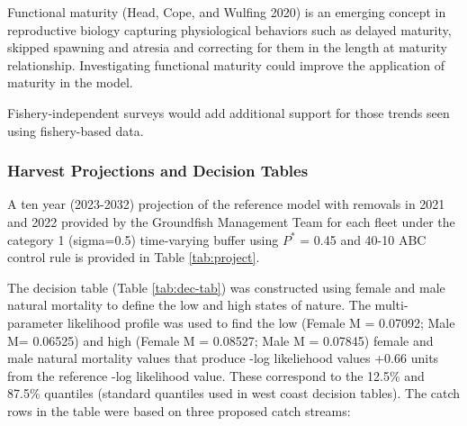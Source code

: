 \documentclass[11pt,
  english,
  a4paper,
]{article}
\begin{document}
\leavevmode\tagmcend\tagstructend\par


Functional maturity {(Head, Cope, and Wulfing 2020)\leavevmode\tagmcend\tagstructend} is an emerging concept in reproductive biology capturing physiological behaviors such as delayed maturity, skipped spawning and atresia and correcting for them in the length at maturity relationship. Investigating functional maturity could improve the application of maturity in the model.

\leavevmode\tagmcend\tagstructend\par


Fishery-independent surveys would add additional support for those trends seen using fishery-based data.

\leavevmode\tagmcend\tagstructend\par


\hypertarget{harvest-projections-and-decision-tables}{%
\subsubsection{Harvest Projections and Decision Tables}\label{harvest-projections-and-decision-tables}}

\leavevmode\tagmcend\tagstructend


A ten year (2023-2032) projection of the reference model with removals in 2021 and 2022 provided by the Groundfish Management Team for each fleet under the category 1 (sigma=0.5) time-varying buffer using {\(P^*\)\leavevmode\tagmcend\tagstructend} = 0.45 and 40-10 ABC control rule is provided in Table \ref{tab:project}.

\leavevmode\tagmcend\tagstructend\par


The decision table (Table \ref{tab:dec-tab}) was constructed using female and male natural mortality to define the low and high states of nature. The multi-parameter likelihood profile was used to find the low (Female M = 0.07092; Male M= 0.06525) and high (Female M = 0.08527; Male M = 0.07845) female and male natural mortality values that produce -log likeliehood values +0.66 units from the reference -log likelihood value. These correspond to the 12.5\% and 87.5\% quantiles (standard quantiles used in west coast decision tables). The catch rows in the table were based on three proposed catch streams:
\end{document}
